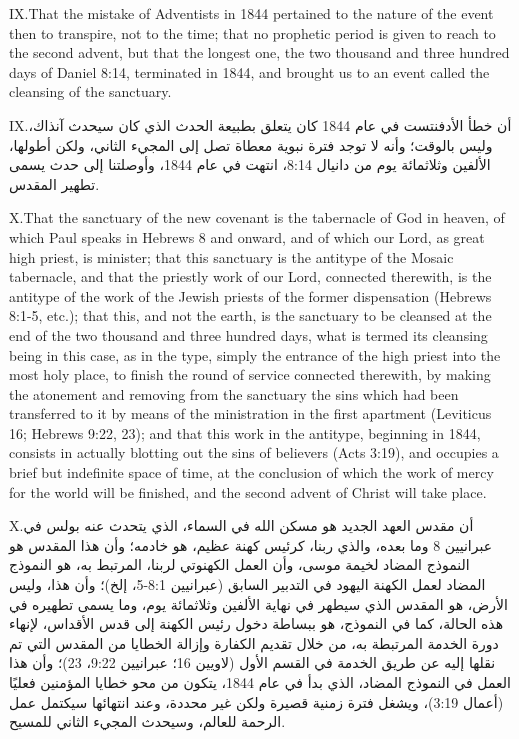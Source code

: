 \lettrine{IX.} That the mistake of Adventists in 1844 pertained to the nature of the event then to transpire, not to the time; that no prophetic period is given to reach to the second advent, but that the longest one, the two thousand and three hundred days of Daniel 8:14, terminated in 1844, and brought us to an event called the cleansing of the sanctuary.


\lettrine{IX.} أن خطأ الأدفنتست في عام 1844 كان يتعلق بطبيعة الحدث الذي كان سيحدث آنذاك، وليس بالوقت؛ وأنه لا توجد فترة نبوية معطاة تصل إلى المجيء الثاني، ولكن أطولها، الألفين وثلاثمائة يوم من دانيال 8:14، انتهت في عام 1844، وأوصلتنا إلى حدث يسمى تطهير المقدس.


\lettrine{X.} That the sanctuary of the new covenant is the tabernacle of God in heaven, of which Paul speaks in Hebrews 8 and onward, and of which our Lord, as great high priest, is minister; that this sanctuary is the antitype of the Mosaic tabernacle, and that the priestly work of our Lord, connected therewith, is the antitype of the work of the Jewish priests of the former dispensation (Hebrews 8:1-5, etc.); that this, and not the earth, is the sanctuary to be cleansed at the end of the two thousand and three hundred days, what is termed its cleansing being in this case, as in the type, simply the entrance of the high priest into the most holy place, to finish the round of service connected therewith, by making the atonement and removing from the sanctuary the sins which had been transferred to it by means of the ministration in the first apartment (Leviticus 16; Hebrews 9:22, 23); and that this work in the antitype, beginning in 1844, consists in actually blotting out the sins of believers (Acts 3:19), and occupies a brief but indefinite space of time, at the conclusion of which the work of mercy for the world will be finished, and the second advent of Christ will take place.


\lettrine{X.} أن مقدس العهد الجديد هو مسكن الله في السماء، الذي يتحدث عنه بولس في عبرانيين 8 وما بعده، والذي ربنا، كرئيس كهنة عظيم، هو خادمه؛ وأن هذا المقدس هو النموذج المضاد لخيمة موسى، وأن العمل الكهنوتي لربنا، المرتبط به، هو النموذج المضاد لعمل الكهنة اليهود في التدبير السابق (عبرانيين 8:1-5، إلخ)؛ وأن هذا، وليس الأرض، هو المقدس الذي سيطهر في نهاية الألفين وثلاثمائة يوم، وما يسمى تطهيره في هذه الحالة، كما في النموذج، هو ببساطة دخول رئيس الكهنة إلى قدس الأقداس، لإنهاء دورة الخدمة المرتبطة به، من خلال تقديم الكفارة وإزالة الخطايا من المقدس التي تم نقلها إليه عن طريق الخدمة في القسم الأول (لاويين 16؛ عبرانيين 9:22، 23)؛ وأن هذا العمل في النموذج المضاد، الذي بدأ في عام 1844، يتكون من محو خطايا المؤمنين فعليًا (أعمال 3:19)، ويشغل فترة زمنية قصيرة ولكن غير محددة، وعند انتهائها سيكتمل عمل الرحمة للعالم، وسيحدث المجيء الثاني للمسيح.


